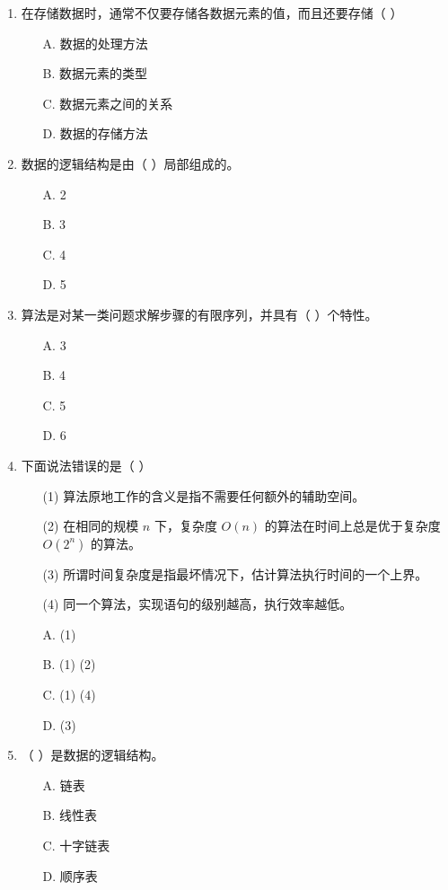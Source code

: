 \documentclass[12pt, a4paper]{article}
\begin{document}
\begin{enumerate}[label=\arabic*.]
	\item 在存储数据时，通常不仅要存储各数据元素的值，而且还要存储（ ）
	      \begin{enumerate}
		      \item[A.] 数据的处理方法
		      \item[B.] 数据元素的类型
		      \item[C.] 数据元素之间的关系
		      \item[D.] 数据的存储方法
	      \end{enumerate}

	\item 数据的逻辑结构是由（ ）局部组成的。
	      \begin{enumerate}
		      \item[A.] 2
		      \item[B.] 3
		      \item[C.] 4
		      \item[D.] 5
	      \end{enumerate}

	\item 算法是对某一类问题求解步骤的有限序列，并具有（ ）个特性。
	      \begin{enumerate}
		      \item[A.] 3
		      \item[B.] 4
		      \item[C.] 5
		      \item[D.] 6
	      \end{enumerate}

	\item 下面说法错误的是（ ）
	      \begin{enumerate}
		      \item[(1)] 算法原地工作的含义是指不需要任何额外的辅助空间。
		      \item[(2)] 在相同的规模 $n$ 下，复杂度 $O(n)$ 的算法在时间上总是优于复杂度 $O(2^n)$ 的算法。
		      \item[(3)] 所谓时间复杂度是指最坏情况下，估计算法执行时间的一个上界。
		      \item[(4)] 同一个算法，实现语句的级别越高，执行效率越低。
		      \item[A.] (1)
		      \item[B.] (1) (2)
		      \item[C.] (1) (4)
		      \item[D.] (3)
	      \end{enumerate}

	\item （ ）是数据的逻辑结构。
	      \begin{enumerate}
		      \item[A.] 链表
		      \item[B.] 线性表
		      \item[C.] 十字链表
		      \item[D.] 顺序表
	      \end{enumerate}


\end{enumerate}
\end{document}
